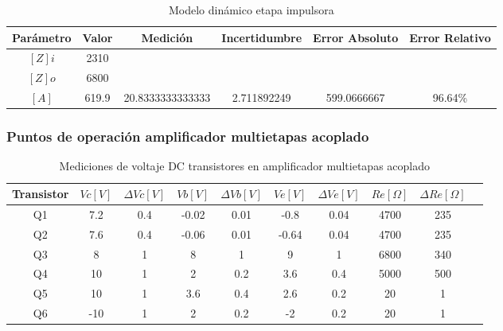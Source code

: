\begin{table}[h!]
\centering
\begin{tabular}{|c|c|c|c|c|c|}
\hline
\textbf{Parámetro} & \textbf{Valor} & \textbf{Medición} & \textbf{Incertidumbre} & \textbf{Error Absoluto} & \textbf{Error Relativo} \\ \hline
$[Z] i$ & 2310 & & & & \\ \hline
$[Z] o$ & 6800 & & & & \\ \hline
$[A]$ & 619.9 & 20.8333333333333 & 2.711892249 & 599.0666667 & 96.64\% \\ \hline
\end{tabular}
\caption{Modelo dinámico etapa impulsora}
\label{tab:med-modelo-dinamico-etapa-impulsora}
\end{table}

\FloatBarrier
\subsubsection{Puntos de operación amplificador multietapas acoplado}

\begin{table}[h!]
\centering
\begin{tabular}{|c|c|c|c|c|c|c|c|c|c|}
\hline
\textbf{Transistor} & \textbf{\(Vc[V]\)} & \textbf{\(\varDelta Vc[V]\)} & \textbf{\(Vb[V]\)} & \textbf{\(\varDelta Vb[V]\)} & \textbf{\(Ve[V]\)} & \textbf{\(\varDelta Ve[V]\)} & \textbf{\(Re[\Omega]\)} & \textbf{\(\varDelta Re[\Omega]\)} \\ \hline
Q1 & 7.2 & 0.4 & -0.02 & 0.01 & -0.8 & 0.04 & 4700 & 235 \\ \hline
Q2 & 7.6 & 0.4 & -0.06 & 0.01 & -0.64 & 0.04 & 4700 & 235 \\ \hline
Q3 & 8 & 1 & 8 & 1 & 9 & 1 & 6800 & 340 \\ \hline
Q4 & 10 & 1 & 2 & 0.2 & 3.6 & 0.4 & 5000 & 500 \\ \hline
Q5 & 10 & 1 & 3.6 & 0.4 & 2.6 & 0.2 & 20 & 1 \\ \hline
Q6 & -10 & 1 & 2 & 0.2 & -2 & 0.2 & 20 & 1 \\ \hline
\end{tabular}
\caption{Mediciones de voltaje DC transistores en amplificador multietapas acoplado}
\label{tab:med-mediciones-voltaje-dc-transistores-amplificador-multietapas-acoplado}
\end{table}

